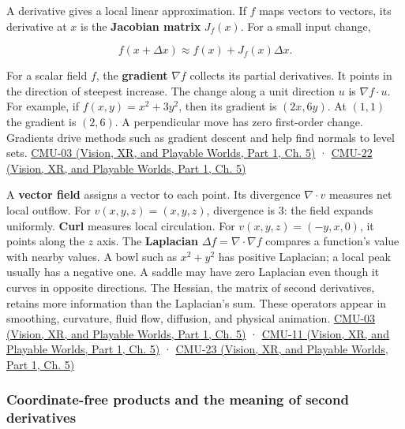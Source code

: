 A derivative gives a local linear approximation. If \(f\) maps vectors to vectors, its derivative at \(x\) is the \textbf{Jacobian matrix} \(J_f(x)\). For a small input change,

\[
f(x+\Delta x)\approx f(x)+J_f(x)\Delta x.
\]

For a scalar field \(f\), the \textbf{gradient} \(\nabla f\) collects its partial derivatives. It points in the direction of steepest increase. The change along a unit direction \(u\) is \(\nabla f\cdot u\). For example, if \(f(x,y)=x^2+3y^2\), then its gradient is \((2x,6y)\). At \((1,1)\) the gradient is \((2,6)\). A perpendicular move has zero first-order change. Gradients drive methods such as gradient descent and help find normals to level sets. \href{../07-Vision-XR-and-Playable-Worlds-P01/main.pdf\#nameddest=04-visual-computing-ii-ch036-cmu-03---vector-calculus-preview}{CMU-03 (Vision, XR, and Playable Worlds, Part 1, Ch. 5)} · \href{../07-Vision-XR-and-Playable-Worlds-P01/main.pdf\#nameddest=04-visual-computing-ii-ch036-cmu-22---optimization}{CMU-22 (Vision, XR, and Playable Worlds, Part 1, Ch. 5)}

A \textbf{vector field} assigns a vector to each point. Its divergence \(\nabla\cdot v\) measures net local outflow. For \(v(x,y,z)=(x,y,z)\), divergence is 3: the field expands uniformly. \textbf{Curl} measures local circulation. For \(v(x,y,z)=(-y,x,0)\), it points along the \(z\) axis. The \textbf{Laplacian} \(\Delta f=\nabla\cdot\nabla f\) compares a function's value with nearby values. A bowl such as \(x^2+y^2\) has positive Laplacian; a local peak usually has a negative one. A saddle may have zero Laplacian even though it curves in opposite directions. The Hessian, the matrix of second derivatives, retains more information than the Laplacian's sum. These operators appear in smoothing, curvature, fluid flow, diffusion, and physical animation. \href{../07-Vision-XR-and-Playable-Worlds-P01/main.pdf\#nameddest=04-visual-computing-ii-ch036-cmu-03---vector-calculus-preview}{CMU-03 (Vision, XR, and Playable Worlds, Part 1, Ch. 5)} · \href{../07-Vision-XR-and-Playable-Worlds-P01/main.pdf\#nameddest=04-visual-computing-ii-ch036-cmu-11---digital-geometry-processing}{CMU-11 (Vision, XR, and Playable Worlds, Part 1, Ch. 5)} · \href{../07-Vision-XR-and-Playable-Worlds-P01/main.pdf\#nameddest=04-visual-computing-ii-ch036-cmu-23---physically-based-animation-and-pdes}{CMU-23 (Vision, XR, and Playable Worlds, Part 1, Ch. 5)}

\subsubsection{Coordinate-free products and the meaning of second derivatives}\label{03-visual-computing-i-ch001-coordinate-free-products-and-the-meaning-of-second-derivatives}

